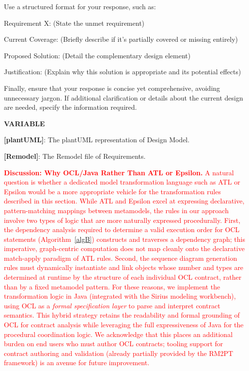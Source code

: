 \documentclass[pdflatex,sn-mathphys-num]{sn-jnl}%
\theoremstyle{thmstyleone}%
\theoremstyle{thmstyletwo}%
\theoremstyle{thmstylethree}%
\begin{document}
\begin{itemize}
\begin{tcolorbox}[title = {Traceability Between Design and Requirements}]
Use a structured format for your response, such as:

Requirement X: (State the unmet requirement)

Current Coverage: (Briefly describe if it’s partially covered or missing entirely)

Proposed Solution: (Detail the complementary design element)

Justification: (Explain why this solution is appropriate and its potential effects)

Finally, ensure that your response is concise yet comprehensive, avoiding unnecessary jargon. If additional clarification or details about the current design are needed, specify the information required.

\tcblower
\textbf{VARIABLE}

\textbf{[plantUML]}: The plantUML representation of Design Model.

\textbf{[Remodel]}: The Remodel file of Requirements.
\end{tcolorbox}
\end{itemize}

\textcolor{red}{\noindent\textbf{Discussion: Why OCL/Java Rather Than ATL or Epsilon.}
A natural question is whether a dedicated model transformation language such as ATL or Epsilon would be a more appropriate vehicle for the transformation rules described in this section.
While ATL and Epsilon excel at expressing declarative, pattern-matching mappings between metamodels, the rules in our approach involve two types of logic that are more naturally expressed procedurally.
First, the dependency analysis required to determine a valid execution order for OCL statements (Algorithm~\ref{algB}) constructs and traverses a dependency graph; this imperative, graph-centric computation does not map cleanly onto the declarative match-apply paradigm of ATL rules.
Second, the sequence diagram generation rules must dynamically instantiate and link objects whose number and types are determined at runtime by the structure of each individual OCL contract, rather than by a fixed metamodel pattern.
For these reasons, we implement the transformation logic in Java (integrated with the Sirius modeling workbench), using OCL as a \emph{formal specification layer} to parse and interpret contract semantics.
This hybrid strategy retains the readability and formal grounding of OCL for contract analysis while leveraging the full expressiveness of Java for the procedural coordination logic.
We acknowledge that this places an additional burden on end users who must author OCL contracts; tooling support for contract authoring and validation (already partially provided by the RM2PT framework) is an avenue for future improvement.}
\end{document}
